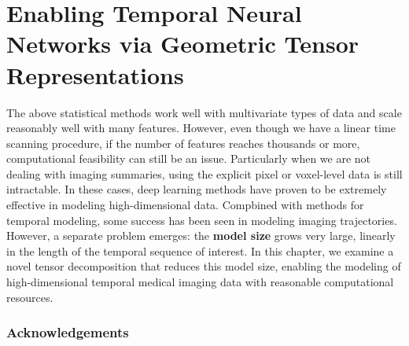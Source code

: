\chapter{Enabling Temporal Neural Networks via Geometric Tensor Representations} \label{chap:ott} 

The above statistical methods work well with
multivariate types of data and scale reasonably well with many features.
However,
even though we have a linear time scanning procedure,
if the number of features reaches thousands or more,
computational feasibility can still be an issue.
Particularly when we are not dealing with
imaging summaries,
using the explicit pixel or voxel-level
data is still intractable.
In these cases,
deep learning methods have
proven to be extremely effective
in modeling high-dimensional data.
Compbined with methods
for temporal modeling,
some success has been seen
in modeling imaging trajectories.
However, a separate problem
emerges: the \textbf{model size}
grows very large, linearly 
in the length of the temporal sequence of interest.
In this chapter, we examine
a novel tensor decomposition
that reduces this model size,
enabling the modeling of high-dimensional
temporal medical imaging data
with reasonable computational resources.


%




\subsection{Acknowledgements}
